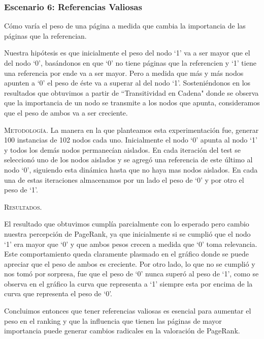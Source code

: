 \vspace{2em}
\subsubsection{Escenario 6: Referencias Valiosas} Cómo varía el peso de una página a medida que cambia la importancia de las páginas que la referencian.
\vspace{1em}

Nuestra hipótesis es que inicialmente el peso del nodo `1' va a ser mayor que el del nodo `0', basándonos en que `0' no tiene páginas que la referencien y `1' tiene una referencia por ende va a ser mayor. Pero a medida que más y más nodos apunten a `0' el peso de éste va a superar al del nodo `1'. Sosteniéndonos en los resultados que obtuvimos a partir de ``Transitividad en Cadena" donde se observa que la importancia de un nodo se transmite a los nodos que apunta, consideramos que el peso de ambos va a ser creciente.

\vspace{1em}
\noindent \textsc{Metodología}. La manera en la que planteamos esta experimentación fue, generar 100 instancias de 102 nodos cada uno. Inicialmente el nodo `0' apunta al nodo `1' y todos los demás nodos permanecían aislados. En cada iteración del test se seleccionó uno de los nodos aislados y se agregó una referencia de este último al nodo `0', siguiendo esta dinámica hasta que no haya mas nodos aislados.
En cada una de estas iteraciones almacenamos por un lado el peso de `0' y por otro el peso de `1'.

\vspace{1em}
\noindent \textsc{Resultados}. 

\vspace{1em}
El resultado que obtuvimos cumplía parcialmente con lo esperado pero cambio nuestra percepción de PageRank, ya que inicialmente si se cumplió que el nodo `1' era mayor que `0' y que ambos pesos crecen a medida que `0' toma relevancia. Este comportamiento queda claramente plasmado en el gráfico donde se puede apreciar que el peso de ambos es creciente. 
Por otro lado, lo que no se cumplió y nos tomó por sorpresa, fue que el peso de `0' nunca superó al peso de `1', como se observa en el gráfico la curva que representa a `1' siempre esta por encima de la curva que representa el peso de `0'.

\vspace{1em}
Concluimos entonces que tener referencias valiosas es esencial para aumentar el peso en el ranking y que la influencia que tienen las páginas de mayor importancia puede generar cambios radicales en la valoración de PageRank.



